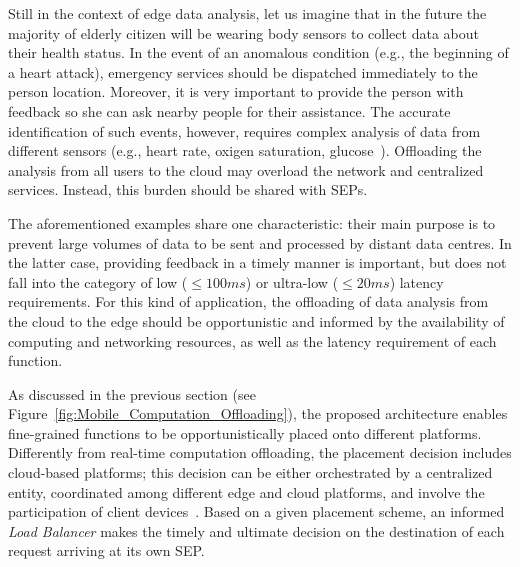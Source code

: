 \documentclass[letterpaper, 10 pt, conference]{ieeeconf}  %
\begin{document}
Still in the context of edge data analysis, 
let us imagine that in the future the majority of elderly citizen will be wearing body sensors to collect data about their health status. In the event of an anomalous condition (e.g., the beginning of a heart attack), emergency services should be dispatched immediately to the person location. Moreover, it is very important to provide the person with feedback so she can ask nearby people for their assistance.
The accurate identification of such events, however, requires complex analysis of data from different sensors (e.g., heart rate, oxigen saturation, glucose~\cite{}). Offloading the analysis from all users to the cloud may overload the network and centralized services. Instead, this burden should be shared with SEPs.%

The aforementioned examples share one characteristic: their main purpose is to prevent large volumes of data to be sent and processed by distant data centres. In the latter case, providing feedback in a timely manner is important, but does not fall into the category of low ($\leq 100ms$) or ultra-low ($\leq 20ms$) latency requirements. For this kind of application, the offloading of data analysis from the cloud to the edge should be opportunistic and informed by the availability of computing and networking resources, as well as the latency requirement of each function.

As discussed in the previous section (see Figure~\ref{fig:Mobile_Computation_Offloading}), the proposed architecture enables fine-grained functions to be opportunistically placed onto different platforms. Differently from real-time computation offloading, the placement decision includes cloud-based platforms; this decision can be either orchestrated by a centralized entity, coordinated among different edge and cloud platforms, and involve the participation of client devices~\cite{Mach:2017}. Based on a given placement scheme, an informed \textit{Load Balancer} makes the timely and ultimate decision on the destination of each request arriving at its own SEP.

\end{document}
